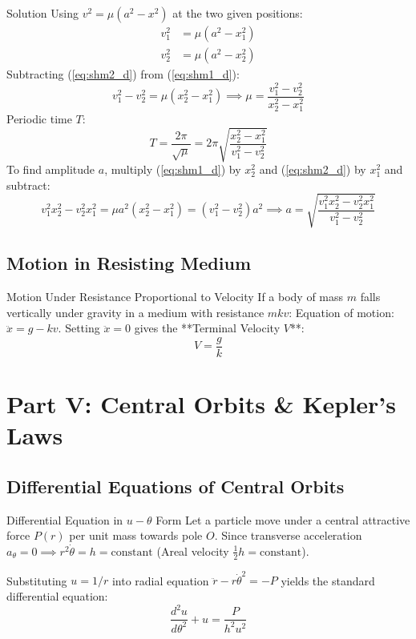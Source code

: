 \documentclass[11pt,a4paper]{article}
\begin{document}
\begin{proofbox}{Solution}
Using $v^2 = \mu(a^2 - x^2)$ at the two given positions:
\begin{align}
v_1^2 &= \mu(a^2 - x_1^2) \label{eq:shm1_d} \\
v_2^2 &= \mu(a^2 - x_2^2) \label{eq:shm2_d}
\end{align}
Subtracting (\ref{eq:shm2_d}) from (\ref{eq:shm1_d}):
\[
v_1^2 - v_2^2 = \mu (x_2^2 - x_1^2) \implies \mu = \frac{v_1^2 - v_2^2}{x_2^2 - x_1^2}
\]
Periodic time $T$:
\begin{equation}
T = \frac{2\pi}{\sqrt{\mu}} = 2\pi \sqrt{\frac{x_2^2 - x_1^2}{v_1^2 - v_2^2}}
\end{equation}
To find amplitude $a$, multiply (\ref{eq:shm1_d}) by $x_2^2$ and (\ref{eq:shm2_d}) by $x_1^2$ and subtract:
\[
v_1^2 x_2^2 - v_2^2 x_1^2 = \mu a^2 (x_2^2 - x_1^2) = (v_1^2 - v_2^2) a^2 \implies a = \sqrt{\frac{v_1^2 x_2^2 - v_2^2 x_1^2}{v_1^2 - v_2^2}}
\]
\end{proofbox}

\subsection{Motion in Resisting Medium}

\begin{theorembox}{Motion Under Resistance Proportional to Velocity}
If a body of mass $m$ falls vertically under gravity in a medium with resistance $m k v$:
Equation of motion: $\ddot{x} = g - k v$.
Setting $\ddot{x} = 0$ gives the **Terminal Velocity $V$**:
\begin{equation}
V = \frac{g}{k}
\end{equation}
\end{theorembox}

\section{Part V: Central Orbits \& Kepler's Laws}

\subsection{Differential Equations of Central Orbits}

\begin{theorembox}{Differential Equation in $u - \theta$ Form}
Let a particle move under a central attractive force $P(r)$ per unit mass towards pole $O$.
Since transverse acceleration $a_\theta = 0 \implies r^2\dot{\theta} = h = \text{constant}$ (Areal velocity $\frac{1}{2}h = \text{constant}$).

Substituting $u = 1/r$ into radial equation $\ddot{r} - r\dot{\theta}^2 = -P$ yields the standard differential equation:
\begin{equation}
\frac{d^2 u}{d\theta^2} + u = \frac{P}{h^2 u^2}
\end{equation}
\end{theorembox}
\end{document}
